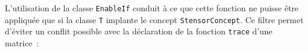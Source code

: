 \documentclass[rectoverso,pleiades,pstricks,leqno,anti]{texmf/note_technique_2010}
\begin{document}
\begin{itemize}
  \begin{center}
    \begin{minipage}{0.8\textwidth}
      \mbox{}\\
      \hlstd{}\hlsym{$<$}\hlstd{}\hlsym{$>$}\hspace*{\fill}\\
      \hlsym{::}\hlsym{::}\hlsym{$<$}\hspace*{\fill}\\
      \hlstd{}\hlstd{\ \ }\hlsym{::}\hlsym{::}\hlsym{$<$}\hlsym{,}\hlsym{$>$::}\hlsym{,}\hspace*{\fill}\\
      \hlstd{}\hlstd{\ \ }\hlsym{$<$}\hlsym{$>$::}\hspace*{\fill}\\
      \hlsym{$>$::}\hspace*{\fill}\\
      \hlstd{}\hlsym{(}\hlstd{}\hlsym{\&);}\\
    \end{minipage}
  \end{center}

  L'utilisation de la classe \texttt{EnableIf} conduit à ce que cette
  fonction ne puisse être appliquée que si la classe \texttt{T}
  implante le concept \texttt{StensorConcept}. Ce filtre permet
  d'éviter un conflit possible avec la déclaration de la fonction
  \texttt{trace} d'une matrice~:


\end{itemize}
\end{document}
